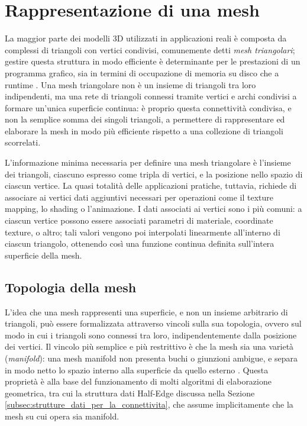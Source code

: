\section{Rappresentazione di una mesh}
\label{sec:rappresentazione_mesh}

La maggior parte dei modelli 3D utilizzati in applicazioni reali è composta da complessi di triangoli con vertici condivisi, comunemente detti \emph{mesh triangolari}; gestire questa struttura in modo efficiente è determinante per le prestazioni di un programma grafico, sia in termini di occupazione di memoria su disco che a runtime \cite{marschner2021fcg}. Una mesh triangolare non è un insieme di triangoli tra loro indipendenti, ma una rete di triangoli connessi tramite vertici e archi condivisi a formare un'unica superficie continua: è proprio questa connettività condivisa, e non la semplice somma dei singoli triangoli, a permettere di rappresentare ed elaborare la mesh in modo più efficiente rispetto a una collezione di triangoli scorrelati.

L'informazione minima necessaria per definire una mesh triangolare è l'insieme dei triangoli, ciascuno espresso come tripla di vertici, e la posizione nello spazio di ciascun vertice. La quasi totalità delle applicazioni pratiche, tuttavia, richiede di associare ai vertici dati aggiuntivi necessari per operazioni come il texture mapping, lo shading o l'animazione. I dati associati ai vertici sono i più comuni: a ciascun vertice possono essere associati parametri di materiale, coordinate texture, o altro; tali valori vengono poi interpolati linearmente all'interno di ciascun triangolo, ottenendo così una funzione continua definita sull'intera superficie della mesh.


\subsection{Topologia della mesh}
\label{subsec:mesh_topology}

L'idea che una mesh rappresenti una superficie, e non un insieme arbitrario di triangoli, può essere formalizzata attraverso vincoli sulla sua topologia, ovvero sul modo in cui i triangoli sono connessi tra loro, indipendentemente dalla posizione dei vertici. Il vincolo più semplice e più restrittivo è che la mesh sia una varietà (\emph{manifold}): una mesh manifold non presenta buchi o giunzioni ambigue, e separa in modo netto lo spazio interno alla superficie da quello esterno \cite{marschner2021fcg}. Questa proprietà è alla base del funzionamento di molti algoritmi di elaborazione geometrica, tra cui la struttura dati Half-Edge discussa nella Sezione \ref{subsec:strutture_dati_per_la_connettivita}, che assume implicitamente che la mesh su cui opera sia manifold.

